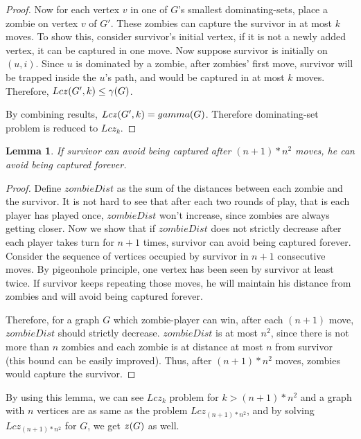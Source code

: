 \documentclass[1p]{elsarticle}
\newtheorem{lemma}[theorem]{Lemma}
\newcommand{\zn}{\ooalign{$z$\cr\hfil\rule[.5ex]{.2em}{.08ex}\hfil\cr}}
\begin{document}
\begin{proof}
		Now for each vertex $v$ in one of $G$'s smallest dominating-sets, place a zombie on vertex $v$ of $G'$. These
		zombies can capture the survivor in at most $k$ moves. To show this, consider survivor's initial vertex, if it
		is not a newly added vertex, it can be captured in one move. Now suppose survivor is initially on $(u,i)$. Since
		$u$ is dominated by a zombie, after zombies' first move, survivor will be trapped inside the $u$'s path, and would
		be captured in at most $k$ moves. Therefore, $Lc\zn(G',k) \leq \gamma(G)$.

		By combining results, $Lc\zn(G',k) = gamma(G)$. Therefore dominating-set problem is reduced to $Lcz_k$.

	\end{proof}

	\begin{lemma}
		\label{limit-moves}
		If survivor can avoid being captured after $(n + 1) * n^2$ moves, he can avoid being captured forever.
	\end{lemma}
	\begin{proof}
		Define $zombieDist$ as the sum of the distances between each zombie and the survivor. It is not hard to see that
		after each two rounds of play, that is each player has played once, $zombieDist$ won't increase, since zombies
		are always getting closer. Now we show that if $zombieDist$ does not strictly decrease after each player takes
		turn for $n + 1$ times, survivor can avoid being captured forever. Consider the sequence of vertices occupied by
		survivor in $n + 1$ consecutive moves. By pigeonhole principle, one vertex has been seen by survivor at least
		twice. If survivor keeps repeating those moves, he will maintain his distance from zombies and will avoid being
		captured forever.

		Therefore, for a graph $G$ which zombie-player can win, after each $(n + 1)$ move, $zombieDist$ should strictly
		decrease. $zombieDist$ is at most $n^2$, since there is not more than $n$ zombies and each zombie is at distance
		at most $n$ from survivor (this bound can be easily improved). Thus, after $(n + 1) * n^2$ moves, zombies would
		capture the survivor.
	\end{proof}

	By using this lemma, we can see $Lcz_k$ problem for $k > (n + 1) * n^2$ and a graph with $n$ vertices are as same as
	the problem $Lcz_{(n + 1) * n^2}$, and by solving $Lcz_{(n + 1) * n^2}$ for $G$, we get $\zn(G)$ as well.
\end{document}
